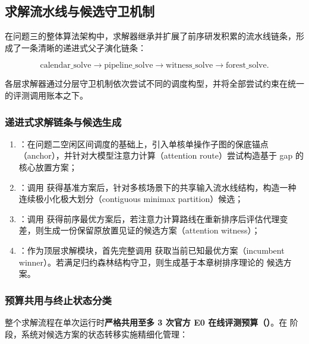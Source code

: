 \documentclass[anonymous,notoc]{gmcm2026}
\providecommand{\tightlist}{\setlength{\itemsep}{0pt}\setlength{\parskip}{0pt}}
\begin{document}
\subsection{求解流水线与候选守卫机制}

在问题三的整体算法架构中，求解器继承并扩展了前序研发积累的流水线链条，形成了一条清晰的递进式父子演化链条：

\begin{equation}
\text{calendar\_solve} \longrightarrow \text{pipeline\_solve} \longrightarrow \text{witness\_solve} \longrightarrow \text{forest\_solve}.
\end{equation}

各层求解器通过分层守卫机制依次尝试不同的调度构型，并将全部尝试约束在统一的评测调用账本之下。

\subsubsection{递进式求解链条与候选生成}

\begin{enumerate}
\def\labelenumi{\arabic{enumi}.}
\tightlist
\item
  \textbf{\texttt{}}：在问题二空闲区间调度的基础上，引入单核单操作子图的保底锚点（anchor），并针对大模型注意力计算（attention route）尝试构造基于 gap 的核心放置方案；
\item
  \textbf{\texttt{}}：调用 \texttt{} 获得基准方案后，针对多核场景下的共享输入流水线结构，构造一种连续极小化极大划分（contiguous minimax partition）候选；
\item
  \textbf{\texttt{}}：调用 \texttt{} 获得前序最优方案后，若注意力计算路线在重新排序后评估代理变差，则生成一份保留原放置见证的候选方案（attention witness）；
\item
  \textbf{\texttt{}}：作为顶层求解模块，首先完整调用 \texttt{} 获取当前已知最优方案（incumbent winner）。若满足归约森林结构守卫，则生成基于本章树排序理论的 \texttt{} 候选方案。
\end{enumerate}

\subsubsection{预算共用与终止状态分类}

整个求解流程在单次运行时\textbf{严格共用至多 3 次官方 E0 在线评测预算（\texttt{}）}。在 \texttt{} 阶段，系统对候选方案的状态转移实施精细化管理：
\end{document}
